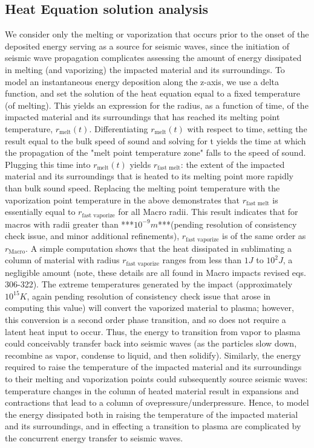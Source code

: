 \documentclass[prd,reprint,10pt]{revtex4-1}
\newcommand*\te[1]{\text{#1}}
\begin{document}
\subsection{Heat Equation solution analysis}
We consider only the melting or vaporization that occurs prior to the onset of the deposited energy serving as a source for seismic waves, since the initiation of seismic wave propagation complicates assessing the amount of energy dissipated in melting (and vaporizing) the impacted material and its surroundings.  To model an instantaneous energy deposition along the z-axis, we use a delta function, and set the solution of the heat equation equal to a fixed temperature (of melting). This yields an expression for the radius, as a function of time, of the impacted material and its surroundings that has reached its melting point temperature, $r_\te{melt}(t)$.  Differentiating $r_\te{melt}(t)$ with respect to time, setting the result equal to the bulk speed of sound and solving for t yields the time at which the propagation of the "melt point temperature zone" falls to the speed of sound.  Plugging this time into $r_\te{melt}(t)$ yields $r_\te{fast melt}$: the extent of the impacted material and its surroundings that is heated to its melting point more rapidly than bulk sound speed. Replacing the melting point temperature with the vaporization point temperature in the above demonstrates that $r_\te{fast melt}$ is essentially equal to $r_\te{fast vaporize}$ for all Macro radii.  This result indicates that for macros with radii greater than ***$10^{-9} m$***(pending resolution of consistency check issue, and minor additional refinements), $r_\te{fast vaporize}$ is of the same order as $r_\te{Macro}$.  A simple computation shows that the heat dissipated in sublimating a column of material with radius $r_\te{fast vaporize}$ ranges from less than $1 J$ to $10^2 J$, a negligible amount (note, these details are all found in Macro impacts revised eqs. 306-322). 
The extreme temperatures generated by the impact (approximately $10^{15} K$, again pending resolution of consistency check issue that arose in computing this value) will convert the vaporized material to plasma; however, this conversion is a second order phase transition, and so does not require a latent heat input to occur.  Thus, the energy to transition from vapor to plasma could conceivably transfer back into seismic waves (as the particles slow down, recombine as vapor, condense to liquid, and then solidify). Similarly, the energy required to raise the temperature of the impacted material and its surroundings to their melting and vaporization points could subsequently source seismic waves: temperature changes in the column of heated material result in expansions  and contractions that lead to a column of ovepressure/underpressure. Hence, to model the energy dissipated both in raising the temperature of the impacted material and its surroundings, and in effecting a transition to plasma are complicated by the concurrent energy transfer to seismic waves.
\end{document}
